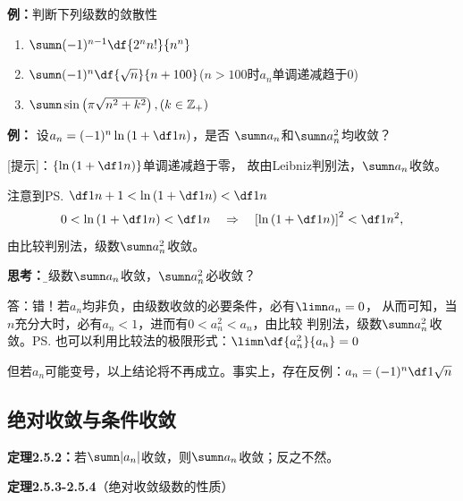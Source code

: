 {\bf 例：}判断下列级数的敛散性
\begin{enumerate} [(1)]
  \setlength{\itemindent}{1cm}
  \item $\sumn(-1)^{n-1}\df{2^nn!}{n^n}$ 
  \item $\sumn(-1)^n\df{\sqrt{n}}{n+100}$\hfill{($n>100$时$a_n$单调递减趋于$0$)}
  \item $\sumn\sin\left(\pi\sqrt{n^2+k^2}\right),(k\in\mathbb{Z}_+)$
\end{enumerate}

{\bf 例：} 设$a_n=(-1)^n\ln\left(1+\df1n\right)$，是否 
$\sumn a_n$和$\sumn a^2_n$均收敛？

[提示]：$\left\{\ln\left(1+\df1n\right)\right\}$单调递减趋于零，
故由Leibniz判别法，$\sumn a_n$收敛。

注意到\ps{$\df1{n+1}<\ln\left(1+\df1n\right)<\df1n$}
$$0<\ln\left(1+\df1n\right)<\df1n\quad\Rightarrow\quad
\left[\ln\left(1+\df1n\right)\right]^2<\df1{n^2},$$
由比较判别法，级数$\sumn a^2_n$收敛。

{\bf 思考：}{\b 若级数$\sumn a_n$收敛，$\sumn a^2_n$必收敛？}

答：错！若$a_n$均非负，由级数收敛的必要条件，必有$\limn a_n=0$，
从而可知，当$n$充分大时，必有$a_n<1$，进而有$0<a^2_n<a_n$，由比较
判别法，级数$\sumn a^2_n$收敛。\ps{也可以利用比较法的极限形式：$\limn\df{a^2_n}{a_n}=0$}

但若$a_n$可能变号，以上结论将不再成立。事实上，存在反例：$a_n=(-1)^n\df1{\sqrt n}$

% 

\subsection{绝对收敛与条件收敛}

{\bf 定理2.5.2：}若$\sumn |a_n|$收敛，则$\sumn a_n$收敛；反之不然。

{\bf 定理2.5.3-2.5.4}（绝对收敛级数的性质）

